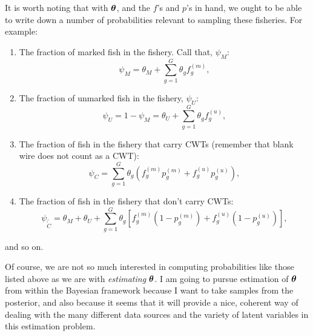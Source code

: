 \documentclass[11pt]{article}
\def\bm#1{\mathpalette\bmstyle{#1}}
\def\bmstyle#1#2{\mbox{\boldmath$#1#2$}}
\newcommand{\btheta}{\bm{\theta}}
\begin{document}
It is worth noting that with $\btheta$, and the $f$'s and $p$'s in hand, we ought to be able to
write down a number of probabilities relevant to sampling these fisheries.  For example:
\begin{enumerate}
\item The fraction of marked fish in the fishery.  Call that, $\psi_M$:
\[
\psi_M = \theta_M + \sum_{g=1}^G \theta_g f^{(m)}_g,
\]
\item The fraction of unmarked fish in the fishery, $\psi_U$:
\[
\psi_U = 1- \psi_M = \theta_U + \sum_{g=1}^G \theta_g f^{(u)}_g,
\]
\item The fraction of fish in the fishery that carry CWTs (remember that blank wire does not
count as a CWT):
\[
\psi_C = \sum_{g=1}^G \theta_g(f^{(m)}_g p^{(m)}_g + f^{(u)}_g p^{(u)}_g),
\]
\item The fraction of fish in the fishery that don't carry CWTs:
\[
\psi_{\not{C}} = \theta_M + \theta_U + \sum_{g=1}^G \theta_g[f^{(m)}_g (1 - p^{(m)}_g) + f^{(u)}_g (1-p^{(u)}_g)],
\]
\end{enumerate}
and so on. 



Of course, we are not so much interested in computing probabilities like those listed above as we are 
with {\em estimating} $\btheta$.  I am going to pursue estimation of $\btheta$ from within the Bayesian
framework because I want to take samples from the posterior, and also because it seems that it will
provide a nice, coherent way of dealing with the many different data sources and the variety of 
latent variables in this estimation problem.





 
\end{document}
